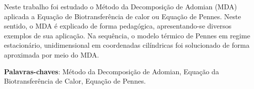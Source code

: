 \begin{resumo}
    
    Neste trabalho foi estudado o Método da Decomposição de Adomian (MDA)  aplicada a Equação de Biotransferência de calor ou Equação de Pennes. Neste sentido, o MDA é explicado de forma pedagógica, apresentando-se  diversos exemplos de sua aplicação. Na sequência, o modelo térmico de Pennes em regime estacionário, unidimensional em coordenadas cilíndricas foi solucionado de forma aproximada por meio do MDA.




 \vspace{\onelineskip}
    
 \noindent
 \textbf{Palavras-chaves}: Método da Decomposição de Adomian, Equação da Biotransferência de Calor, Equação de Pennes.

\end{resumo}
